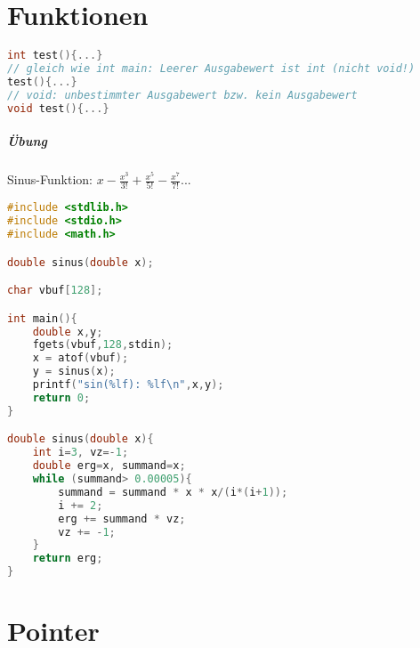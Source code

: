 \documentclass{scrreprt}
\begin{document}
\chapter{Funktionen}
\begin{lstlisting}[language=C]
int test(){...}
// gleich wie int main: Leerer Ausgabewert ist int (nicht void!)
test(){...}
// void: unbestimmter Ausgabewert bzw. kein Ausgabewert
void test(){...}
\end{lstlisting}

\paragraph{Übung} Sinus-Funktion: $x-\frac{x^3}{3!}+\frac{x^5}{5!}-\frac{x^7}{7!}...$
\begin{lstlisting}[language=C]
#include <stdlib.h>
#include <stdio.h>
#include <math.h>

double sinus(double x);

char vbuf[128];

int main(){
	double x,y;
	fgets(vbuf,128,stdin); 
	x = atof(vbuf);
	y = sinus(x);
	printf("sin(%lf): %lf\n",x,y);
	return 0;
}

double sinus(double x){
	int i=3, vz=-1;
	double erg=x, summand=x;
	while (summand> 0.00005){
		summand = summand * x * x/(i*(i+1));
		i += 2;
		erg += summand * vz;
		vz += -1;
	}
	return erg;
}

\end{lstlisting}

\chapter{Pointer}
\end{document}
